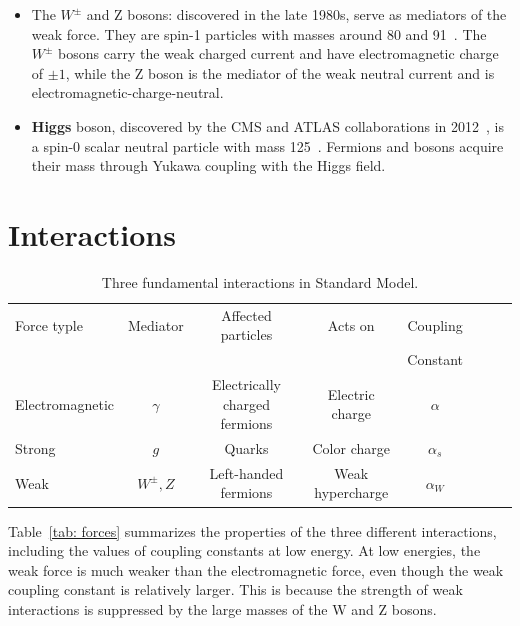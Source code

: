 \begin{itemize}
\begin{itemize}
 \item The $W^{\pm}$ and Z bosons: discovered in the late 1980s, serve as mediators of the weak force. They are spin-1 particles with masses around 80 and 91~\GeV. The \textbf{$W^{\pm}$} bosons carry the weak charged current and have electromagnetic charge of $\pm 1$, while the Z boson is the mediator of the weak neutral current and is electromagnetic-charge-neutral. 
  \item \textbf{Higgs} boson, discovered by the CMS and ATLAS collaborations in 2012~\cite{Aad:2012tfa,Chatrchyan:2012xdj}, is a spin-0 scalar neutral particle with mass 125~\GeV. Fermions and bosons acquire their mass through Yukawa coupling with the Higgs field. 
\end{itemize}
\end{itemize}
 
 


\section{Interactions}
\begin{table}[tbh]
\centering
\tiny
\begin{tabular}{|l|c|c|c|c|c|c|c}


\hline
  Force typle & Mediator & Affected particles & Acts on & Coupling\\
  &&&&Constant\\ 
  \hline
\hline
  Electromagnetic & $\gamma$&Electrically charged fermions&Electric charge& $\alpha$ \\
  Strong & $g$ &Quarks & Color charge& $\alpha_s$ \\
  Weak & $W^{\pm}, Z$ &Left-handed fermions & Weak hypercharge& $\alpha_W$ \\
\hline
\end{tabular}
\caption{Three fundamental interactions in Standard Model. }
\label{tab:forces}
\end{table}


\par Table~\ref{tab: forces} summarizes the properties of the three different interactions, including the values of coupling constants at low energy. 
At low energies, the weak force is much weaker than the electromagnetic force, even though the weak coupling constant is relatively larger. 
This is because the strength of weak interactions is suppressed by the large masses of the W and Z bosons. 


